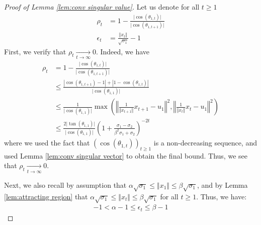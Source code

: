 \begin{proof}[Proof of Lemma \ref{lem:conv singular value}]
    Let us denote for all $t \ge 1$
    \begin{align}
        \rho_t & = 1 - \frac{\vert \cos(\theta_{1, t})\vert} {\vert \cos(\theta_{1, t+1})\vert} \\
        \epsilon_t & = \frac{\Vert x_t \Vert }{\sqrt{\sigma_1}} - 1 
    \end{align}
    First, we verify that $\rho_t \underset{t \to \infty}{\longrightarrow} 0$. Indeed, we have 
    \begin{align*}
        \rho_t & = 1 - \frac{\vert \cos(\theta_{1,t} ) \vert }{\vert \cos(\theta_{1,t+1} ) \vert} \\
        & \le \frac{ \left\vert \cos(\theta_{1,t+1} )  -  1   \right\vert +    \left\vert  1 - \cos(\theta_{1,t})
   \right\vert}{\vert \cos(\theta_{1,1})\vert} \\
        & \le  \frac{1}{\vert \cos(\theta_{1,1})\vert}   \max\left(  \left\Vert \frac{1}{\Vert x_{t+1} \Vert }x_{t+1} - u_1\right\Vert^2, \left\Vert \frac{1}{\Vert x_t \Vert }x_t - u_1\right\Vert^2\right)\\
        & \le \frac{2 \vert \tan(\theta_{1,1})\vert }{\vert \cos(\theta_{1,1})\vert } \left( 1 + \frac{\sigma_1 - \sigma_2 }{\beta^2 \sigma_1 + \sigma_2 }\right)^{-2t}
    \end{align*}
    where we used the fact that $(\cos(\theta_{1,t}))_{t\ge 1}$ is a non-decreasing sequence, and  used Lemma \ref{lem:conv singular vector} to obtain the final bound. Thus, we see that $\rho_t \underset{t \to \infty}{\longrightarrow} 0$.
    
    \medskip 
    Next, we also recall by assumption that $\alpha \sqrt{\sigma_1} \le \Vert x_1 \Vert \le \beta \sqrt{\sigma_1}$, and by Lemma \ref{lem:attracting region} that $ \alpha \sqrt{\sigma_1} \le \Vert x_t \Vert \le \beta \sqrt{\sigma_1}$ for all $t \ge 1$. Thus, we have: 
    \begin{align}
        -1 < \alpha - 1 \le \epsilon_t \le \beta - 1
    \end{align}



\end{proof}
